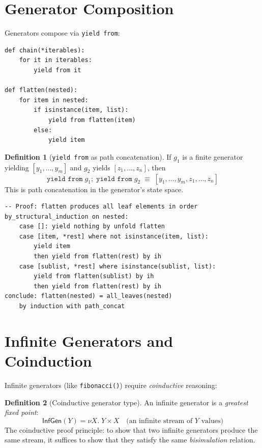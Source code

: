 \documentclass[11pt,a4paper]{report}
\theoremstyle{definition}
\newtheorem{definition}{Definition}[chapter]
\theoremstyle{plain}
\begin{document}
\section{Generator Composition}

Generators compose via \texttt{yield from}:

\begin{lstlisting}[style=python]
def chain(*iterables):
    for it in iterables:
        yield from it

def flatten(nested):
    for item in nested:
        if isinstance(item, list):
            yield from flatten(item)
        else:
            yield item
\end{lstlisting}

\begin{definition}[\texttt{yield from} as path concatenation]
If $g_1$ is a finite generator yielding $[y_1, \ldots, y_m]$ and $g_2$ yields
$[z_1, \ldots, z_n]$, then
\[
  \texttt{yield from}\;g_1;\;\texttt{yield from}\;g_2
  \;\equiv\; [y_1, \ldots, y_m, z_1, \ldots, z_n]
\]
This is path concatenation in the generator's state space.
\end{definition}

\begin{lstlisting}[style=proof]
-- Proof: flatten produces all leaf elements in order
by_structural_induction on nested:
    case []: yield nothing by unfold flatten
    case [item, *rest] where not isinstance(item, list):
        yield item
        then yield from flatten(rest) by ih
    case [sublist, *rest] where isinstance(sublist, list):
        yield from flatten(sublist) by ih
        then yield from flatten(rest) by ih
conclude: flatten(nested) = all_leaves(nested)
    by induction with path_concat
\end{lstlisting}

\section{Infinite Generators and Coinduction}

Infinite generators (like \texttt{fibonacci()}) require \emph{coinductive} reasoning:

\begin{definition}[Coinductive generator type]
An infinite generator is a \emph{greatest fixed point}:
\[
  \mathsf{InfGen}(Y) = \nu X.\; Y \times X
  \quad\text{(an infinite stream of $Y$ values)}
\]
The coinductive proof principle: to show that two infinite generators produce
the same stream, it suffices to show that they satisfy the same
\emph{bisimulation} relation.
\end{definition}
\end{document}
